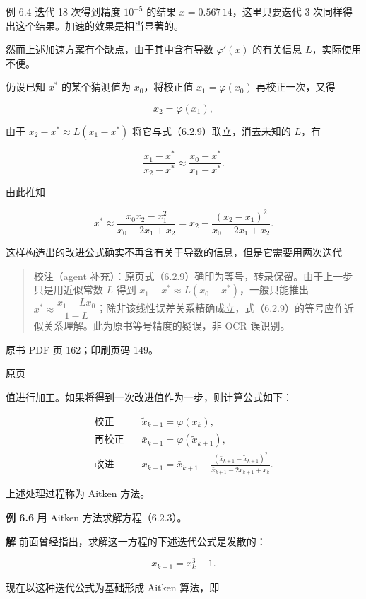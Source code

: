 例 6.4 迭代 18 次得到精度 \(10^{-5}\) 的结果 \(x=0.567\,14\)，这里只要迭代 3 次同样得出这个结果。加速的效果是相当显著的。

然而上述加速方案有个缺点，由于其中含有导数 \(\varphi'(x)\) 的有关信息 \(L\)，实际使用不便。

仍设已知 \(x^*\) 的某个猜测值为 \(x_0\)，将校正值 \(x_1=\varphi(x_0)\) 再校正一次，又得

\[
x_2=\varphi(x_1),
\]

由于 \(x_2-x^*\approx L(x_1-x^*)\) 将它与式（6.2.9）联立，消去未知的 \(L\)，有

\[
\frac{x_1-x^*}{x_2-x^*}\approx\frac{x_0-x^*}{x_1-x^*}.
\]

由此推知

\[
x^*\approx\frac{x_0x_2-x_1^2}{x_0-2x_1+x_2}=x_2-\frac{(x_2-x_1)^2}{x_0-2x_1+x_2}.
\]

这样构造出的改进公式确实不再含有关于导数的信息，但是它需要用两次迭代

\begin{quote}
校注（agent 补充）：原页式（6.2.9）确印为等号，转录保留。由于上一步只是用近似常数 \(L\) 得到 \(x_1-x^*\approx L(x_0-x^*)\)，一般只能推出 \(x^*\approx\dfrac{x_1-Lx_0}{1-L}\)；除非该线性误差关系精确成立，式（6.2.9）的等号应作近似关系理解。此为原书等号精度的疑误，非 OCR 误识别。
\end{quote}

\clearpage

原书 PDF 页 162；印刷页码 149。

\href{source-images/pdf-162.jpeg}{原页}

值进行加工。如果将得到一次改进值作为一步，则计算公式如下：

\[
\begin{aligned}
\text{校正}\quad&\tilde{x}_{k+1}=\varphi(x_k),\\
\text{再校正}\quad&\bar{x}_{k+1}=\varphi(\tilde{x}_{k+1}),\\
\text{改进}\quad&x_{k+1}=\bar{x}_{k+1}-\frac{(\bar{x}_{k+1}-\tilde{x}_{k+1})^2}{\bar{x}_{k+1}-2\tilde{x}_{k+1}+x_k}.
\end{aligned}
\tag{6.2.11}
\]

上述处理过程称为 Aitken 方法。

\textbf{例 6.6} 用 Aitken 方法求解方程（6.2.3）。

\textbf{解} 前面曾经指出，求解这一方程的下述迭代公式是发散的：

\[
x_{k+1}=x_k^3-1.
\tag{6.2.12}
\]

现在以这种迭代公式为基础形成 Aitken 算法，即

